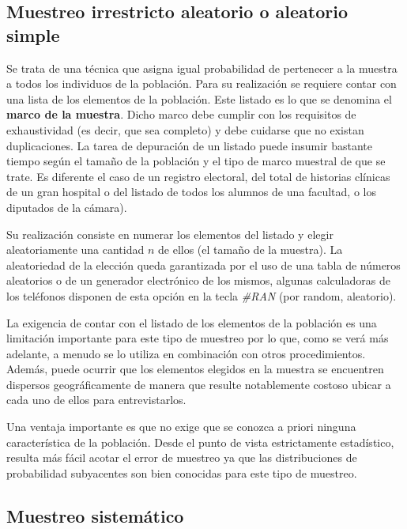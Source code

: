 \documentclass[]{book}
\begin{document}
\hypertarget{muestreo-irrestricto-aleatorio-o-aleatorio-simple}{%
\subsection{Muestreo irrestricto aleatorio o aleatorio simple}\label{muestreo-irrestricto-aleatorio-o-aleatorio-simple}}

Se trata de una técnica que asigna igual probabilidad de pertenecer a la
muestra a todos los individuos de la población. Para su realización se
requiere contar con una lista de los elementos de la población. Este
listado es lo que se denomina el \textbf{marco de la muestra}. Dicho marco
debe cumplir con los requisitos de exhaustividad (es decir, que sea
completo) y debe cuidarse que no existan duplicaciones. La tarea de
depuración de un listado puede insumir bastante tiempo según el tamaño
de la población y el tipo de marco muestral de que se trate. Es
diferente el caso de un registro electoral, del total de historias
clínicas de un gran hospital o del listado de todos los alumnos de una
facultad, o los diputados de la cámara).

Su realización consiste en numerar los elementos del listado y elegir
aleatoriamente una cantidad \(n\) de ellos (el tamaño de la muestra). La
aleatoriedad de la elección queda garantizada por el uso de una tabla de
números aleatorios o de un generador electrónico de los mismos, algunas
calculadoras de los teléfonos disponen de esta opción en la tecla \emph{\#RAN} (por random, aleatorio).

La exigencia de contar con el listado de los elementos de la población
es una limitación importante para este tipo de muestreo por lo que, como
se verá más adelante, a menudo se lo utiliza en combinación con otros
procedimientos. Además, puede ocurrir que los elementos elegidos en la
muestra se encuentren dispersos geográficamente de manera que resulte
notablemente costoso ubicar a cada uno de ellos para entrevistarlos.

Una ventaja importante es que no exige que se conozca a priori ninguna
característica de la población. Desde el punto de vista estrictamente
estadístico, resulta más fácil acotar el error de muestreo ya que las
distribuciones de probabilidad subyacentes son bien conocidas para este
tipo de muestreo.

\hypertarget{muestreo-sistematico}{%
\subsection{Muestreo sistemático}\label{muestreo-sistematico}}
\end{document}

